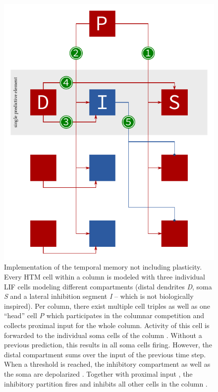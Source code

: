 \begin{figure}
	\begin{center}
		\includegraphics[width=\columnwidth]{../circuitry/column.pdf}
	\end{center}
	\caption{Implementation of the temporal memory not including plasticity. Every HTM cell within a column is modeled with three individual LIF cells modeling different compartments (distal dendrites \emph{D}, soma \emph{S} and a lateral inhibition segment \emph{I} -- which is not biologically inspired). Per column, there exist multiple cell triples as well as one ``head'' cell \emph{P} which participates in the columnar competition and collects proximal input for the whole column. Activity of this cell is forwarded to the individual soma cells of the column \protect{}. Without a previous prediction, this results in all soma cells firing. However, the distal compartment sums over the input of the previous time step. When a threshold is reached, the inhibitory compartment as well as the soma are depolarized \protect{} \protect{}. Together with proximal input \protect{}, the inhibitory partition fires and inhibits all other cells in the column \protect{}.}
	\label{fig:temporal_memory}
\end{figure}

